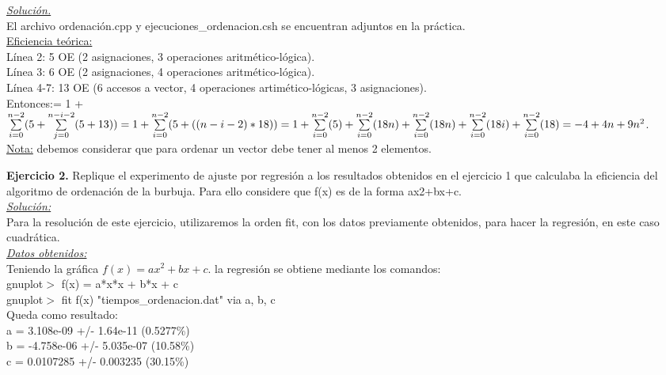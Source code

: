 \documentclass[titlepage, 12pt,a4paper]{article}
\begin{document}
\underline{\emph{Solución.}}\\
El archivo ordenación.cpp y ejecuciones\_ordenacion.csh se encuentran adjuntos en la práctica.\\

\underline{Eficiencia teórica:} \\
	Línea 2: 5 OE (2 asignaciones, 3 operaciones aritmético-lógica).\\
	Línea 3: 6 OE (2 asignaciones, 4 operaciones aritmético-lógica).\\
	Línea 4-7: 13 OE (6 accesos a vector, 4 operaciones artimético-lógicas, 3 asignaciones).\\

Entonces:= 1 + $\sum\limits_{i=0}^{n-2}(5+\sum\limits_{j=0}^{n-i-2}(5+13))= 1 + \sum\limits_{i=0}^{n-2}(5+((n-i-2)*18))= \\
1 + \sum\limits_{i=0}^{n-2}(5) + \sum\limits_{i=0}^{n-2}(18n)+\sum\limits_{i=0}^{n-2}(18n)+ \sum\limits_{i=0}^{n-2}(18i) + \sum\limits_{i=0}^{n-2}(18) = -4 + 4n + 9 n^2$.\\

\small{\underline{Nota:} debemos considerar que para ordenar un vector debe tener al menos 2 elementos.}


\newpage
\textbf{\large Ejercicio 2.} Replique el experimento de ajuste por regresión a los resultados obtenidos en el ejercicio
1 que calculaba la eficiencia del algoritmo de ordenación de la burbuja. Para ello
considere que f(x) es de la forma ax2+bx+c. \\


\underline{\emph{Solución:}}\\
Para la resolución de este ejercicio, utilizaremos la orden fit, con los datos previamente obtenidos, para hacer la regresión, en este caso cuadrática. \\

 \underline{\emph{Datos obtenidos:}}\\
 Teniendo la gráfica $f(x)=ax^2 + bx + c.$ la regresión se obtiene mediante los comandos:\\
gnuplot$>$ f(x) = a*x*x + b*x + c \\
 gnuplot$>$ fit f(x) "tiempos\_ordenacion.dat" via a, b, c\\
 
 Queda como resultado: \\
a    = 3.108e-09      +/- 1.64e-11     (0.5277\%)\\
b    = -4.758e-06     +/- 5.035e-07    (10.58\%)\\
c    = 0.0107285      +/- 0.003235     (30.15\%)\\
\end{document}
